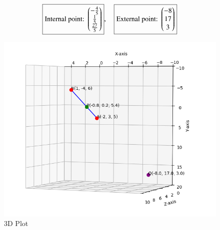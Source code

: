 \documentclass[12pt]{article}
\begin{document}
\[
\boxed{\text{Internal point: } \begin{pmatrix}-\tfrac{4}{5} \\ \tfrac{1}{5} \\ \tfrac{27}{5}\end{pmatrix}}, \quad
\boxed{\text{External point: } \begin{pmatrix}-8 \\ 17 \\ 3\end{pmatrix}}
\]
\begin{figure}
\centering
\includegraphics[width = 1.2\columnwidth]{Figs/Figure_1.png}
\caption{3D Plot}
\label{fig1:plot}
\end{figure}
\end{document}
